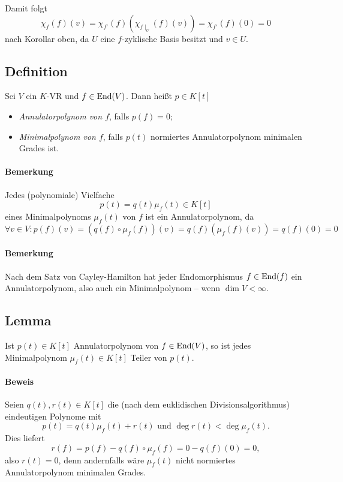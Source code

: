 	Damit folgt
		\[ \chi_f(f)(v) = \chi_{f'}(f) \left(\chi_{f\mid_U}(f)(v) \right) = \chi_{f'}(f)(0)=0 \]
	nach Korollar oben, da $ U $ eine $ f $-zyklische Basis besitzt und $ v\in U $.
	
\subsection{Definition}
\begin{Definition}
	Sei $ V $ ein $ K $-VR und $ f\in\operatorname{End}(V) $. Dann heißt $ p\in K[t] $
		\begin{itemize}
			\item \emph{Annulatorpolynom von $ f $}, falls $ p(f)=0 $;
			\item \emph{Minimalpolynom von $ f $}, falls $ p(t) $ normiertes Annulatorpolynom minimalen Grades ist.
		\end{itemize}
\end{Definition}
\paragraph{Bemerkung}
	Jedes (polynomiale) Vielfache 
		\[ p(t) = q(t)\mu_f(t)\in K[t] \]
	eines Minimalpolynoms $ \mu_f(t) $ von $ f $ ist ein Annulatorpolynom, da
		\[ \forall v\in V: p(f)(v) = \left(q(f)\circ \mu_f(f)\right)(v) = q(f)\left(\mu_f(f)(v)\right) = q(f)(0) = 0 \]
\paragraph{Bemerkung}
	Nach dem Satz von Cayley-Hamilton hat jeder Endomorphismus $ f\in\operatorname{End}(f) $ ein Annulatorpolynom, also auch ein Minimalpolynom -- wenn $ \dim V < \infty $.
	
\subsection{Lemma}
\begin{Lemma}
	Ist $ p(t)\in K[t] $ Annulatorpolynom von $ f\in\operatorname{End}(V) $, so ist jedes Minimalpolynom $ \mu_f(t)\in K[t] $ Teiler von $ p(t) $. 
\end{Lemma}

\paragraph{Beweis}
	Seien $ q(t),r(t)\in K[t] $ die (nach dem euklidischen Divisionsalgorithmus) eindeutigen Polynome mit
		\[ p(t) = q(t)\mu_f(t)+r(t) \text{ und }\deg r(t)<\deg \mu_f(t). \]
	Dies liefert
		\[ r(f) = p(f)-q(f)\circ \mu_f(f) = 0-q(f)(0) = 0, \]
	also $ r(t) = 0 $, denn andernfalls wäre $ \mu_f(t) $ nicht normiertes Annulatorpolynom minimalen Grades.
	
